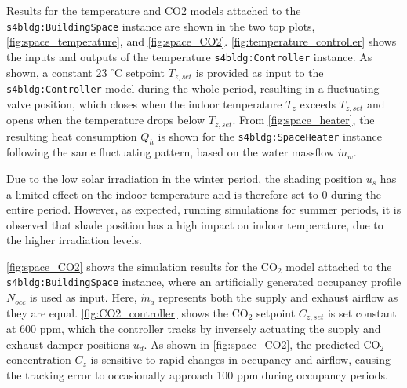 Results for the temperature and CO2 models attached to the \texttt{s4bldg:BuildingSpace} instance are shown in the two top plots, \autoref{fig:space_temperature}, and \autoref{fig:space_CO2}. \autoref{fig:temperature_controller} shows the inputs and outputs of the temperature \texttt{s4bldg:Controller} instance. As shown, a constant 23 $^\circ$C setpoint $T_{z,set}$ is provided as input to the \texttt{s4bldg:Controller} model during the whole period, resulting in a fluctuating valve position, which closes when the indoor temperature $T_z$ exceeds $T_{z,set}$ and opens when the temperature drops below $T_{z,set}$. From \autoref{fig:space_heater}, the resulting heat consumption $\dot{Q}_h$ is shown for the \texttt{s4bldg:SpaceHeater} instance following the same fluctuating pattern, based on the water massflow $\dot{m}_w$. 

Due to the low solar irradiation in the winter period, the shading position $u_{s}$ has a limited effect on the indoor temperature and is therefore set to 0 during the entire period. However, as expected, running simulations for summer periods, it is observed that shade position has a high impact on indoor temperature, due to the higher irradiation levels.


\autoref{fig:space_CO2} shows the simulation results for the CO$_2$ model attached to the \texttt{s4bldg:BuildingSpace} instance, where an artificially generated occupancy profile $N_{occ}$ is used as input. Here, $\dot{m}_a$ represents both the supply and exhaust airflow as they are equal. \autoref{fig:CO2_controller} shows the CO$_2$ setpoint $C_{z,set}$ is set constant at 600 ppm, which the controller tracks by inversely actuating the supply and exhaust damper positions $u_d$. As shown in \autoref{fig:space_CO2}, the predicted CO$_2$-concentration $C_z$ is sensitive to rapid changes in occupancy and airflow, causing the tracking error to occasionally approach  100 ppm during occupancy periods. 

